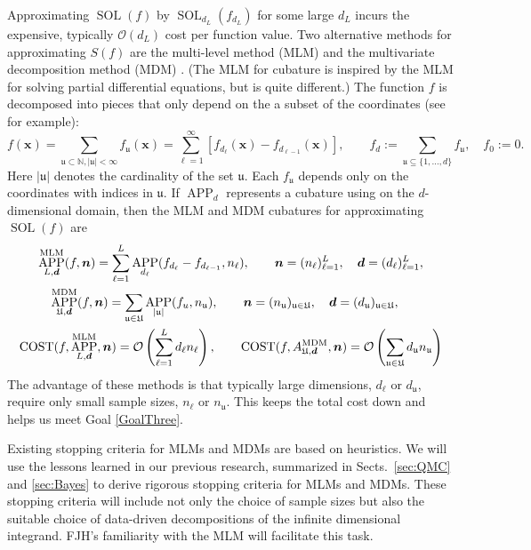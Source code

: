 \documentclass[11pt]{NSFamsart}
\DeclareMathOperator{\cost}{COST}
\newcommand{\naturals}{{\mathbb{N}}}
\newcommand{\fu}{\mathfrak{u}}
\DeclareMathOperator{\SOL}{SOL}
\DeclareMathOperator{\APP}{APP}
\newcommand{\bd}{{\boldsymbol{d}}}
\newcommand{\bx}{{\boldsymbol{x}}}
\newcommand{\bn}{{\boldsymbol{n}}}
\newcommand{\fU}{\mathfrak{U}}
\def\abs#1{\ensuremath{\left \lvert #1 \right \rvert}}
\newcommand{\Order}{\mathcal{O}}
\begin{document}
Approximating $\SOL(f)$ by $\SOL_{d_L}(f_{d_L})$ for some large $d_L$ incurs the expensive, typically $\Order(d_L)$ cost per function value.  Two alternative methods for approximating $S(f)$ are the multi-level method (MLM) \cite{Gil15a} and the  multivariate 
decomposition method (MDM) \cite{Was13b}.  (The MLM for cubature is inspired by the MLM 
for solving partial differential equations, but is quite different.) The function $f$
is decomposed into pieces that only depend on the a subset of the coordinates (see 
\cite{WanHic00b} for example):  
\begin{equation*}
f(\bx) = \sum_{\fu \subset \naturals, \abs{\fu} < \infty} f_{\fu}(\bx) = \sum_{\ell 
=1}^\infty [f_{d_\ell}(\bx) - f_{d_{\ell-1}}(\bx)], \qquad  f_d:= \sum_{\fu \subseteq \{1, 
\ldots, d\}} f_\fu, \quad f_0:= 0.
\end{equation*}
Here $\abs{\fu}$ denotes the cardinality of the set $\fu$.  Each $f_{\fu}$ depends only 
on the coordinates with indices in $\fu$.  If $\APP_{d}$ represents a cubature 
using on the $d$-dimensional domain, then the MLM and MDM cubatures 
for approximating $\SOL(f)$ are 
\begin{gather*}
\APP^{\textup{MLM}}_{L,\bd}(f,\bn) = \sum_{\ell=1}^L \APP_{d_\ell}(f_{d_\ell} - f_{d_{\ell-1}},n_\ell), \qquad 
\bn = (n_\ell)_{\ell = 1}^L, \quad \bd = (d_\ell)_{\ell = 1}^L, \\
\APP^{\textup{MDM}}_{\fU,\bd}(f,\bn) = \sum_{\fu \in \fU} \APP_{\abs{\fu}}(f_{u},n_{\fu}), \qquad 
\bn = (n_\fu)_{\fu \in \fU}, \quad \bd = (d_\fu)_{\fu \in \fU}, \quad  \\
\cost(f,\APP^{\textup{MLM}}_{L,\bd},\bn) = \Order\left (\sum_{\ell=1}^L d_\ell 
n_\ell \right), \qquad 
\cost(f,A^{\textup{MDM}}_{\fU,\bd},\bn) = \Order\left (\sum_{\fu \in \fU} d_\fu 
n_\fu\right)
\end{gather*}
The advantage of these methods is that typically large dimensions, $d_\ell$ or $d_{\fu}$, require only small sample sizes, $n_\ell$ or $n_\fu$.  This keeps the total cost down and helps us meet Goal \ref{GoalThree}.

Existing stopping criteria for MLMs and MDMs are based on heuristics.  We will use the lessons learned in our previous research, summarized in  Sects.\ \ref{sec:QMC} and \ref{sec:Bayes} to derive rigorous stopping criteria for MLMs and MDMs. These stopping criteria will include not only the choice of sample sizes but also the suitable choice of data-driven decompositions of the infinite dimensional integrand.  FJH's familiarity with the MLM \cite{HicMGRitNiu09a, NiuHic09a, NiuHic09b} will facilitate this task.
\end{document}
